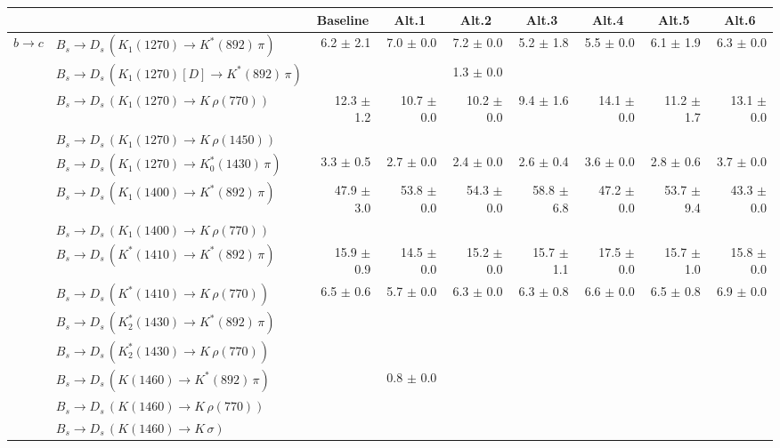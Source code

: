 \begin{tabular}{l l  r  r  r  r  r  r  r  } 
\hline
\hline
& & \multicolumn{1}{c}{Baseline}  & \multicolumn{1}{c}{Alt.1}  & \multicolumn{1}{c}{Alt.2}  & \multicolumn{1}{c}{Alt.3}  & \multicolumn{1}{c}{Alt.4}  & \multicolumn{1}{c}{Alt.5}  & \multicolumn{1}{c}{Alt.6}  \\ 
\hline
\multirow{32}{*}{$b \to c$}  & $B_s \to D_s \, ( K_1(1270) \to K^{*}(892) \, \pi )$ & 6.2 $\pm$ 2.1 & 7.0 $\pm$ 0.0 & 7.2 $\pm$ 0.0 & 5.2 $\pm$ 1.8 & 5.5 $\pm$ 0.0 & 6.1 $\pm$ 1.9 & 6.3 $\pm$ 0.0 \\ 
 & $B_s \to D_s \, ( K_1(1270)[D] \to K^{*}(892) \, \pi )$ &  &  & 1.3 $\pm$ 0.0 &  &  &  &  \\ 
 & $B_s \to D_s \, ( K_1(1270) \to K \, \rho(770) )$ & 12.3 $\pm$ 1.2 & 10.7 $\pm$ 0.0 & 10.2 $\pm$ 0.0 & 9.4 $\pm$ 1.6 & 14.1 $\pm$ 0.0 & 11.2 $\pm$ 1.7 & 13.1 $\pm$ 0.0 \\ 
 & $B_s \to D_s \, ( K_1(1270) \to K \, \rho(1450) )$ &  &  &  &  &  &  &  \\ 
 & $B_s \to D_s \, ( K_1(1270) \to K^{*}_{0}(1430) \, \pi )$ & 3.3 $\pm$ 0.5 & 2.7 $\pm$ 0.0 & 2.4 $\pm$ 0.0 & 2.6 $\pm$ 0.4 & 3.6 $\pm$ 0.0 & 2.8 $\pm$ 0.6 & 3.7 $\pm$ 0.0 \\ 
 & $B_s \to D_s \, ( K_1(1400) \to K^{*}(892) \, \pi )$ & 47.9 $\pm$ 3.0 & 53.8 $\pm$ 0.0 & 54.3 $\pm$ 0.0 & 58.8 $\pm$ 6.8 & 47.2 $\pm$ 0.0 & 53.7 $\pm$ 9.4 & 43.3 $\pm$ 0.0 \\ 
 & $B_s \to D_s \, ( K_1(1400) \to K \, \rho(770) )$ &  &  &  &  &  &  &  \\ 
 & $B_s \to D_s \, ( K^{*}(1410) \to K^{*}(892) \, \pi )$ & 15.9 $\pm$ 0.9 & 14.5 $\pm$ 0.0 & 15.2 $\pm$ 0.0 & 15.7 $\pm$ 1.1 & 17.5 $\pm$ 0.0 & 15.7 $\pm$ 1.0 & 15.8 $\pm$ 0.0 \\ 
 & $B_s \to D_s \, ( K^{*}(1410) \to K \, \rho(770) )$ & 6.5 $\pm$ 0.6 & 5.7 $\pm$ 0.0 & 6.3 $\pm$ 0.0 & 6.3 $\pm$ 0.8 & 6.6 $\pm$ 0.0 & 6.5 $\pm$ 0.8 & 6.9 $\pm$ 0.0 \\ 
 & $B_s \to D_s \, ( K_2^{*}(1430) \to K^{*}(892) \, \pi )$ &  &  &  &  &  &  &  \\ 
 & $B_s \to D_s \, ( K_2^{*}(1430) \to K \, \rho(770) )$ &  &  &  &  &  &  &  \\ 
 & $B_s \to D_s \, ( K(1460) \to K^{*}(892) \, \pi )$ &  & 0.8 $\pm$ 0.0 &  &  &  &  &  \\ 
 & $B_s \to D_s \, ( K(1460) \to K \, \rho(770) )$ &  &  &  &  &  &  &  \\ 
 & $B_s \to D_s \, ( K(1460) \to K \, \sigma )$ &  &  &  &  &  &  &  \\ 

\end{tabular}
